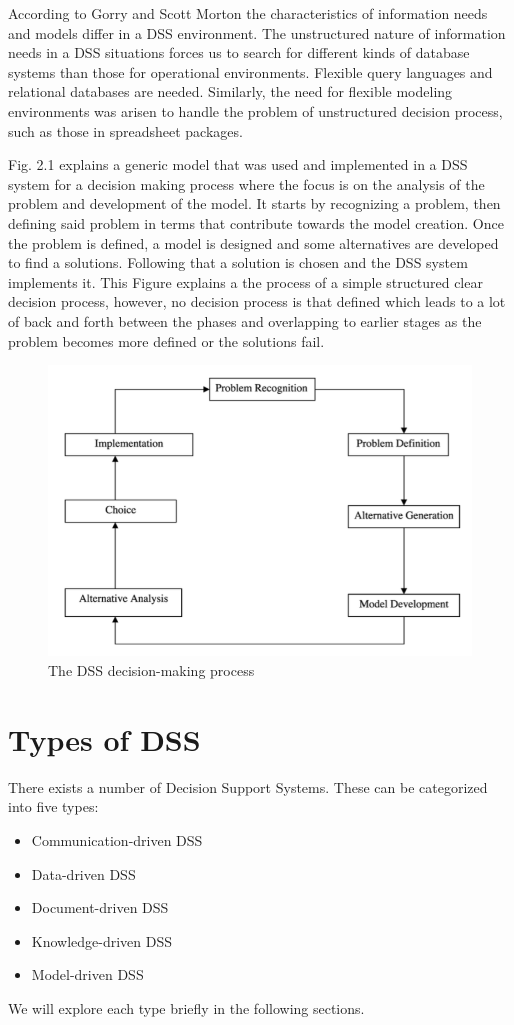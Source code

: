 \indent According to Gorry and Scott Morton the characteristics of information needs and models differ in a DSS environment. The unstructured nature of information needs in a DSS situations forces us to search for different kinds of database systems than those for operational environments. Flexible query languages and relational databases are needed. Similarly, the need for flexible modeling environments was arisen to handle the problem of unstructured decision process, such as those in spreadsheet packages.\cite{shim2002past}

\indent Fig. 2.1 explains a generic model that was used and implemented in a DSS system for a decision making process where the focus is on the analysis of the problem and development of the model. It starts by recognizing a problem, then defining said problem in terms that contribute towards the model creation. Once the problem is defined, a model is designed and some alternatives are developed to find a solutions. Following that a solution is chosen and the DSS system implements it. This Figure explains a the process of a simple structured clear decision process, however, no decision process is that defined which leads to a lot of back and forth between the phases and overlapping to earlier stages as the problem becomes more defined or the solutions fail.\cite{shim2002past}
\begin{figure}[H]
\centering
\includegraphics[scale=0.4]{Images/decisionSuppotProcess.png}
\caption[The DSS decision-making process]{The DSS decision-making process \cite{shim2002past}}
\end{figure}
\section{Types of DSS}
\label{sub:TypesOfDSS}
There exists a number of Decision Support Systems. These can be categorized into five types:
\begin{itemize} 
	\itemsep0em
	\item Communication-driven DSS  
	\item Data-driven DSS 
	\item Document-driven DSS 
	\item Knowledge-driven DSS 
	\item Model-driven DSS 
\end{itemize} 
We will explore each type briefly in the following sections.
